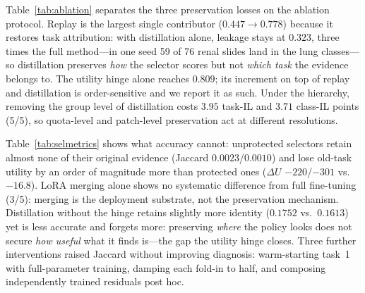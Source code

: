 \documentclass{article}
\begin{document}
Table~\ref{tab:ablation} separates the three preservation losses on the ablation protocol.
Replay is the largest single contributor ($0.447\rightarrow0.778$) because it restores task attribution: with distillation alone, leakage stays at $0.323$, three times the full method---in one seed 59 of 76 renal slides land in the lung classes---so distillation preserves \emph{how} the selector scores but not \emph{which task} the evidence belongs to.
The utility hinge alone reaches $0.809$; its increment on top of replay and distillation is order-sensitive and we report it as such.
Under the hierarchy, removing the group level of distillation costs $3.95$ task-IL and $3.71$ class-IL points (5/5), so quota-level and patch-level preservation act at different resolutions.

\begin{table}[t]
\centering\footnotesize
\caption{\textbf{Selection-level metrics under the ablation protocol} (flat, fold 1, mean over 5 seeds): what accuracy alone cannot show.}
\label{tab:selmetrics}
\end{table}

Table~\ref{tab:selmetrics} shows what accuracy cannot: unprotected selectors retain almost none of their original evidence (Jaccard $0.0023$/$0.0010$) and lose old-task utility by an order of magnitude more than protected ones ($\Delta U$ $-220$/$-301$ vs.\ $-16.8$).
LoRA merging alone shows no systematic difference from full fine-tuning (3/5): merging is the deployment substrate, not the preservation mechanism.
Distillation without the hinge retains slightly more identity ($0.1752$ vs.\ $0.1613$) yet is less accurate and forgets more: preserving \emph{where} the policy looks does not secure \emph{how useful} what it finds is---the gap the utility hinge closes.
Three further interventions raised Jaccard without improving diagnosis: warm-starting task~1 with full-parameter training, damping each fold-in to half, and composing independently trained residuals post hoc.
\end{document}
